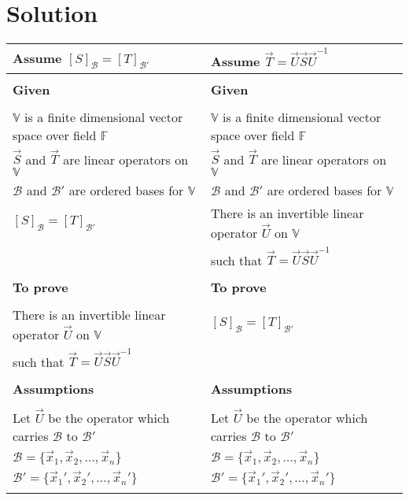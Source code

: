 \documentclass[journal,12pt,twocolumn]{IEEEtran}
\begin{document}
\section{Solution}
\begin{table*}[h!]
\begin{center}
\begin{tabular}{|l|l|}
\hline
Assume $[S]_\mathcal{B} = [T]_\mathcal{B'}$ & Assume $\vec{T} = \vec{U}\vec{S}\vec{U}^{-1}$\\[0.5ex]\hline
 & \\
\textbf{Given}&\textbf{Given}\\
 & \\
$\mathbb V$ is a finite dimensional vector space over field $\mathbb F$ & $\mathbb V$ is a finite dimensional vector space over field $\mathbb F$\\ $\vec{S}$ and $\vec{T}$ are linear operators on $\mathbb V$ & $\vec{S}$ and $\vec{T}$ are linear operators on $\mathbb V$\\
$\mathcal{B}$ and $\mathcal{B'}$ are ordered bases for $\mathbb V$ & $\mathcal{B}$ and $\mathcal{B'}$ are ordered bases for $\mathbb V$\\
$[S]_\mathcal{B} = [T]_\mathcal{B'}$ & There is an invertible linear operator $\vec{U}$ on $\mathbb V$\\
 &  such that $\vec{T} = \vec{U}\vec{S}\vec{U}^{-1}$\\ [0.5ex] \hline
  & \\
\textbf{To prove}&\textbf{To prove}\\
 & \\
There is an invertible linear operator $\vec{U}$ on $\mathbb V$ & $[S]_\mathcal{B} = [T]_\mathcal{B'}$\\
such that $\vec{T} = \vec{U}\vec{S}\vec{U}^{-1}$ & \\ [0.5ex] \hline
 & \\
\textbf{Assumptions}&\textbf{Assumptions}\\
 & \\
Let $\vec{U}$ be the operator which carries $\mathcal{B}$ to $\mathcal{B'}$ &
Let $\vec{U}$ be the operator which carries $\mathcal{B}$ to $\mathcal{B'}$\\
$\mathcal{B} = \{\vec{x}_1,\vec{x}_2,\ldots,\vec{x}_n\}$ &
$\mathcal{B} = \{\vec{x}_1,\vec{x}_2,\ldots,\vec{x}_n\}$\\
$\mathcal{B'} = \{\vec{x}_1',\vec{x}_2',\ldots,\vec{x}_n'\}$ &
$\mathcal{B'} = \{\vec{x}_1',\vec{x}_2',\ldots,\vec{x}_n'\}$\\ [0.5ex] \hline
 & \\

\end{tabular}
\end{center}
\end{table*}
\end{document}
